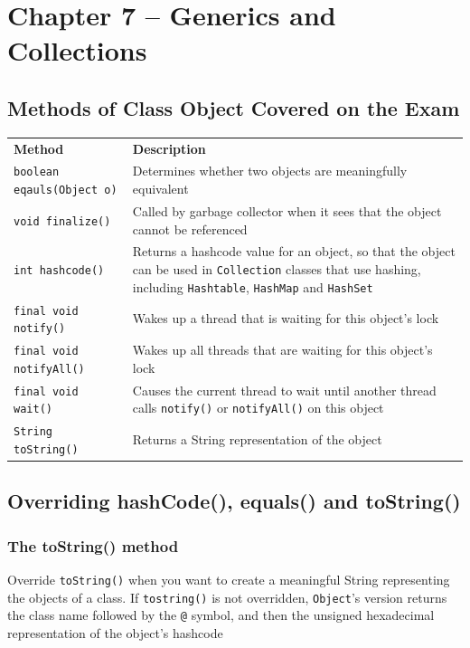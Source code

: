 \section{Chapter 7 -- Generics and Collections}
\subsection{Methods of Class Object Covered on the Exam}
\begin{center}
\begin{tabular}{lp{}}
    \textbf{Method} & \textbf{Description} \\
    \verb#boolean eqauls(Object o)# & Determines whether two objects are 
    meaningfully equivalent \\
    \verb#void finalize()# & Called by garbage collector when it sees that the 
    object cannot be referenced \\
    \verb#int hashcode()# & Returns a hashcode value for an object, so that the 
    object can be used in \verb#Collection# classes that use hashing, including 
    \verb#Hashtable#, \verb#HashMap# and \verb#HashSet# \\
    \verb#final void notify()# & Wakes up a thread that is waiting for this 
    object's lock \\
    \verb#final void notifyAll()# & Wakes up all threads that are waiting for 
    this object's lock \\
    \verb#final void wait()# &  Causes the current thread to wait until another 
    thread calls \verb#notify()# or \verb#notifyAll()# on this object \\
    \verb#String toString()# & Returns a String representation of the object \\
\end{tabular}
\end{center}

\subsection{Overriding hashCode(), equals() and toString()}
\subsubsection{The toString() method}
Override \verb#toString()# when you want to create a meaningful String 
representing the objects of a class. If \verb#tostring()# is not overridden, 
\verb#Object#'s version returns the class name followed by the \verb#@# symbol, 
and then the unsigned hexadecimal representation of the object's hashcode


